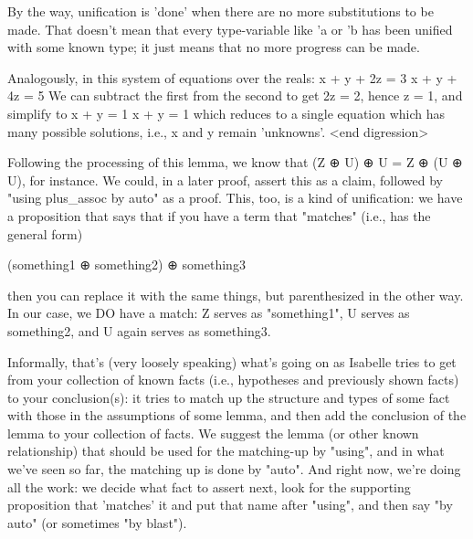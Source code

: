 By the way, unification is 'done' when there are no more substitutions to be made. That doesn't mean that every type-variable like 'a or 'b has been unified with some known type; it just means that no more progress can be made. 

Analogously, in this system of equations over the reals:
x + y + 2z = 3
x + y + 4z = 5
We can subtract the first from the second to get 2z = 2, hence z = 1, and simplify to 
x + y = 1
x + y = 1
which reduces to a single equation which has many possible solutions, i.e., x and y remain 'unknowns'. 
 <end digression> 

Following the processing of this lemma, we know that (Z ⊕ U) ⊕ U = Z ⊕  (U ⊕ U), for instance. We could, in a later proof, assert this as a claim, followed by "using plus_assoc by auto" as a proof. This, too, is a kind of unification: we have a proposition that says that if you have a term that "matches" (i.e., has the general form) 

   (something1  ⊕ something2)  ⊕ something3

then you can replace it with the same things, but parenthesized in the other way. In our case, we DO have a match: Z serves as "something1", U serves as something2, and U again serves as something3. 

Informally, that's (very loosely speaking) what's going on as Isabelle tries to get from your collection of known facts (i.e., hypotheses and previously shown facts) to your conclusion(s): it tries to match up the structure and types of some fact with those in the assumptions of some lemma, and then add the conclusion of the lemma to your collection of facts. We suggest the lemma (or other known relationship) that should be used for the matching-up by "using", and in what we've seen so far, the matching up is done by "auto". And right now, we're doing all the work: we decide what fact to assert next, look for the supporting proposition that 'matches' it and put that name after "using", and then say "by auto" (or sometimes "by blast"). 

